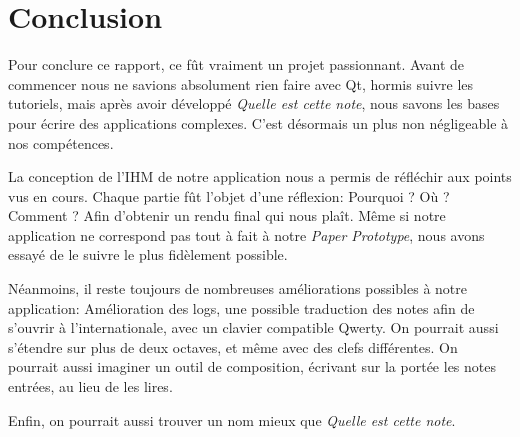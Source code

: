 \documentclass{article}
\begin{document}
\section{Conclusion}
Pour conclure ce rapport, ce fût vraiment un projet passionnant. Avant de commencer nous ne savions absolument rien faire avec Qt, hormis suivre les tutoriels, mais après avoir développé \emph{Quelle est cette note}, nous savons les bases pour écrire des applications complexes. C'est désormais un plus non négligeable à nos compétences. 

La conception de l'IHM de notre application nous a permis de réfléchir aux points vus en cours. Chaque partie fût l'objet d'une réflexion: Pourquoi ? Où ? Comment ? Afin d'obtenir un rendu final qui nous plaît. Même si notre application ne correspond pas tout à fait à notre \emph{Paper Prototype}, nous avons essayé de le suivre le plus fidèlement possible. 

Néanmoins, il reste toujours de nombreuses améliorations possibles à notre application: Amélioration des logs, une possible traduction des notes afin de s'ouvrir à l'internationale, avec un clavier compatible Qwerty. On pourrait aussi s'étendre sur plus de deux octaves, et même avec des clefs différentes. On pourrait aussi imaginer un outil de composition, écrivant sur la portée les notes entrées, au lieu de les lires. 

Enfin, on pourrait aussi trouver un nom mieux que \emph{Quelle est cette note}.
\end{document}
